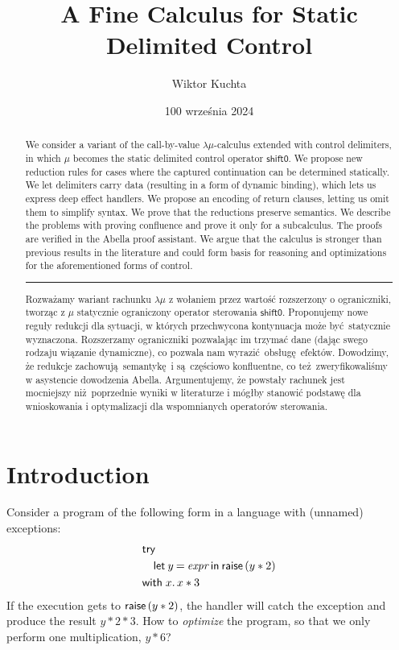 \documentclass[a4paper, 11pt,titlepage, openright, twoside]{report}
\title{\textbf{A Fine Calculus for Static Delimited Control}}
\author{Wiktor Kuchta}
\date{100 września 2024} %
\newcommand{\shiftz}{\textsf{shift0}}
\newcommand{\keyword}[1]{\textsf{\textup{#1}}}
\newcommand{\KwWith}{\keyword{with}}
\newcommand{\KwRaise}{\keyword{raise}}
\newcommand{\Raise}{\KwRaise\,}
\newcommand{\KwTry}{\keyword{try}}
\newcommand{\Try}{\KwTry\;}
\newcommand{\Let}[3]{\keyword{let}\:#1\:\keyword{=}\:#2\:\keyword{in}\:#3}
\newcommand{\+}{\enspace}
\begin{document}
\maketitle


\thispagestyle{empty}
\cleardoublepage
\begin{abstract}
	We consider a variant of the call-by-value $λμ$-calculus extended with control delimiters,
	in which $μ$ becomes the static delimited control operator $\shiftz$.
	We propose new reduction rules for cases where the captured continuation can be determined statically.
	We let delimiters carry data (resulting in a form of dynamic binding), which lets us express deep effect handlers.
	We propose an encoding of return clauses,
	letting us omit them to simplify syntax.
	We prove that the reductions preserve semantics.
	We describe the problems with proving confluence and prove it only for a subcalculus.
	The proofs are verified in the Abella proof assistant.
	We argue that the calculus is stronger than previous results in the literature and could form basis for
	reasoning and optimizations for the aforementioned forms of control.
%
	\begin{center} \rule[3pt]{300pt}{1pt} \end{center}
%
	Rozważamy wariant rachunku $λμ$ z wołaniem przez wartość rozszerzony
	o ograniczniki,
	tworząc z $μ$ statycznie ograniczony operator sterowania $\shiftz$.
	Proponujemy nowe reguły redukcji dla sytuacji,
	w których przechwycona kontynuacja może być statycznie wyznaczona.
	Rozszerzamy ograniczniki pozwalając im trzymać dane
	(dając swego rodzaju wiązanie dynamiczne),
	co pozwala nam wyrazić obsługę efektów.
	Dowodzimy, że redukcje zachowują semantykę i są częściowo konfluentne,
	co też zweryfikowaliśmy w asystencie dowodzenia Abella.
	Argumentujemy, że powstały rachunek jest mocniejszy niż poprzednie wyniki w literaturze
	i mógłby stanowić podstawę dla wnioskowania i optymalizacji dla wspomnianych operatorów sterowania.

\end{abstract}


\thispagestyle{empty}
\cleardoublepage
\setcounter{page}{5}
\tableofcontents


\chapter{Introduction}
Consider a program of the following form in a language with (unnamed) exceptions:
\begin{align*}
	&\Try \\
	&\quad \Let{y}{\textit{expr}}{\Raise (y*2)} \\
	&\KwWith\; x.\,x*3
\end{align*}
If the execution gets to $\Raise (y*2)$, the handler will catch the exception and produce the result $y*2*3$.
How to \textit{optimize} the program, so that we only perform one multiplication, $y*6$?
\end{document}
